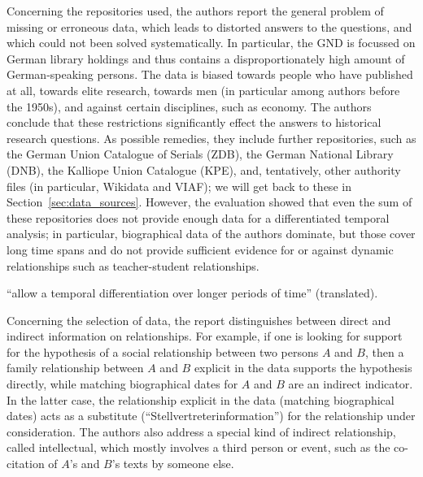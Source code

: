 Concerning the repositories used,
the authors report the general problem of missing or erroneous data,
which leads to distorted answers to the questions, and which could not been solved
systematically. In particular, the GND is focussed on German library holdings
and thus contains a disproportionately high amount of German-speaking persons.
The data is biased towards people who have published at all,
towards elite research, towards men (in particular among authors before the 1950s),
and against certain disciplines, such as economy.
The authors conclude that these restrictions significantly effect the answers to
historical research questions. As possible remedies, they include 
further repositories, such as 
the German Union Catalogue of Serials (ZDB),
the German National Library (DNB),
the Kalliope Union Catalogue (KPE),
and, tentatively, other authority files (in particular, Wikidata and VIAF);
we will get back to these in Section~\ref{sec:data_sources}.
However, the evaluation showed that even the sum of these repositories
does not provide enough data for a differentiated temporal
analysis; in particular, biographical data of the authors 
dominate, but those cover long time spans and do not provide sufficient evidence
for or against dynamic relationships such as teacher-student relationships.

\enquote{allow a temporal differentiation over longer periods of time} (translated).

Concerning the selection of data, the report distinguishes between
direct and indirect information on relationships.
For example, if one is looking for support for the hypothesis of a social relationship
between two persons $A$ and $B$, then a family relationship between $A$ and $B$ explicit in the data
supports the hypothesis directly, while matching biographical dates for $A$ and $B$
are an indirect indicator. In the latter case, the relationship
explicit in the data (matching biographical dates) acts as a substitute
(\enquote{Stellvertreterinformation}) for the relationship under consideration.
The authors also address a special kind of indirect relationship,
called intellectual, which mostly involves a third person
or event, such as the co-citation of $A$'s and $B$'s texts by someone else.


